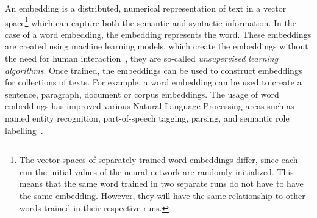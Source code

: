 \documentclass[../../Thesis.tex]{subfiles}
\begin{document}
An embedding is a distributed, numerical representation of text in a vector space\footnote{The vector spaces of separately trained word embeddings differ, since each run the initial values of the neural network are randomly initialized. This means that the same word trained in two separate runs do not have to have the same embedding. However, they will have the same relationship to other words trained in their respective runs.} which can capture both the semantic and syntactic information\cite{mikolov2013distributed}. In the case of a word embedding, the embedding represents the word. These embeddings are created using machine learning models, which create the embeddings without the need for human interaction~\cite{lai2016generate}, they are so-called \textit{unsupervised learning algorithms}. Once trained, the embeddings can be used to construct embeddings for collections of texts. For example, a word embedding can be used to create a sentence, paragraph, document or corpus embeddings. The usage of word embeddings has improved various Natural Language Processing areas such as named entity recognition, part-of-speech tagging, parsing, and semantic role labelling~\citet{luong2013better}.
\end{document}
